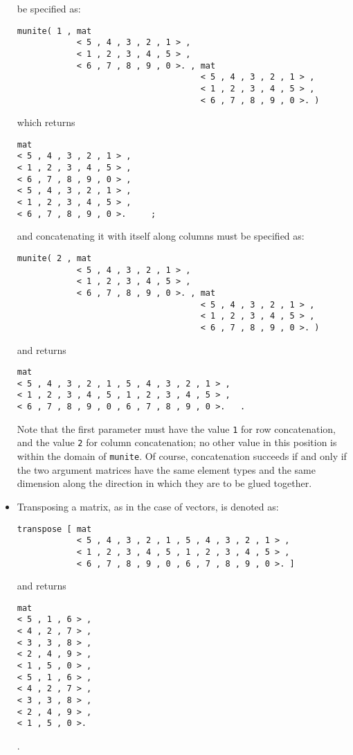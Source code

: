 \begin{itemize}
be specified as:
\begin{verbatim}
munite( 1 , mat 
            < 5 , 4 , 3 , 2 , 1 > ,
            < 1 , 2 , 3 , 4 , 5 > ,
            < 6 , 7 , 8 , 9 , 0 >. , mat 
                                     < 5 , 4 , 3 , 2 , 1 > ,
                                     < 1 , 2 , 3 , 4 , 5 > ,
                                     < 6 , 7 , 8 , 9 , 0 >. )
\end{verbatim}
which returns
\begin{verbatim}
mat 
< 5 , 4 , 3 , 2 , 1 > ,
< 1 , 2 , 3 , 4 , 5 > ,
< 6 , 7 , 8 , 9 , 0 > ,
< 5 , 4 , 3 , 2 , 1 > ,
< 1 , 2 , 3 , 4 , 5 > ,
< 6 , 7 , 8 , 9 , 0 >.     ;
\end{verbatim}
and concatenating it with itself along columns must be specified 
as:
\begin{verbatim}
munite( 2 , mat 
            < 5 , 4 , 3 , 2 , 1 > ,
            < 1 , 2 , 3 , 4 , 5 > ,
            < 6 , 7 , 8 , 9 , 0 >. , mat 
                                     < 5 , 4 , 3 , 2 , 1 > ,
                                     < 1 , 2 , 3 , 4 , 5 > ,
                                     < 6 , 7 , 8 , 9 , 0 >. )

\end{verbatim}
and returns
\begin{verbatim}
mat 
< 5 , 4 , 3 , 2 , 1 , 5 , 4 , 3 , 2 , 1 > ,
< 1 , 2 , 3 , 4 , 5 , 1 , 2 , 3 , 4 , 5 > ,
< 6 , 7 , 8 , 9 , 0 , 6 , 7 , 8 , 9 , 0 >.   .
\end{verbatim}
Note that the first parameter must have the value {\tt 1}
for row concatenation, and the value {\tt 2} for column
concatenation; no other value in this position 
is within the domain of {\tt munite}. Of course, concatenation
succeeds if and only if the two argument matrices have the
same element types and the same dimension along the direction
in which they are to be glued together.
\item Transposing a matrix, as in the case of vectors,
is denoted as:
\begin{verbatim}
transpose [ mat 
            < 5 , 4 , 3 , 2 , 1 , 5 , 4 , 3 , 2 , 1 > ,
            < 1 , 2 , 3 , 4 , 5 , 1 , 2 , 3 , 4 , 5 > ,
            < 6 , 7 , 8 , 9 , 0 , 6 , 7 , 8 , 9 , 0 >. ]
\end{verbatim}
and returns
\begin{verbatim}
mat 
< 5 , 1 , 6 > ,
< 4 , 2 , 7 > ,
< 3 , 3 , 8 > ,
< 2 , 4 , 9 > ,
< 1 , 5 , 0 > ,
< 5 , 1 , 6 > ,
< 4 , 2 , 7 > ,
< 3 , 3 , 8 > ,
< 2 , 4 , 9 > ,
< 1 , 5 , 0 >.
\end{verbatim}      .
\end{itemize}

